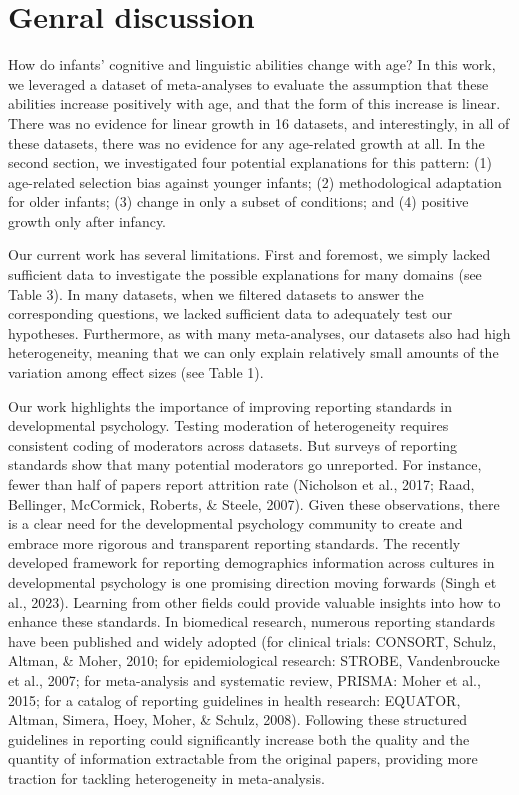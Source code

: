 \documentclass[
  man]{apa6}
\begin{document}
\hypertarget{genral-discussion}{%
\section{Genral discussion}\label{genral-discussion}}

How do infants' cognitive and linguistic abilities change with age? In this work, we leveraged a dataset of meta-analyses to evaluate the assumption that these abilities increase positively with age, and that the form of this increase is linear. There was no evidence for linear growth in 16 datasets, and interestingly, in all of these datasets, there was no evidence for any age-related growth at all. In the second section, we investigated four potential explanations for this pattern: (1) age-related selection bias against younger infants; (2) methodological adaptation for older infants; (3) change in only a subset of conditions; and (4) positive growth only after infancy.

Our current work has several limitations. First and foremost, we simply lacked sufficient data to investigate the possible explanations for many domains (see Table 3). In many datasets, when we filtered datasets to answer the corresponding questions, we lacked sufficient data to adequately test our hypotheses. Furthermore, as with many meta-analyses, our datasets also had high heterogeneity, meaning that we can only explain relatively small amounts of the variation among effect sizes (see Table 1).

Our work highlights the importance of improving reporting standards in developmental psychology. Testing moderation of heterogeneity requires consistent coding of moderators across datasets. But surveys of reporting standards show that many potential moderators go unreported. For instance, fewer than half of papers report attrition rate (Nicholson et al., 2017; Raad, Bellinger, McCormick, Roberts, \& Steele, 2007). Given these observations, there is a clear need for the developmental psychology community to create and embrace more rigorous and transparent reporting standards. The recently developed framework for reporting demographics information across cultures in developmental psychology is one promising direction moving forwards (Singh et al., 2023). Learning from other fields could provide valuable insights into how to enhance these standards. In biomedical research, numerous reporting standards have been published and widely adopted (for clinical trials: CONSORT, Schulz, Altman, \& Moher, 2010; for epidemiological research: STROBE, Vandenbroucke et al., 2007; for meta-analysis and systematic review, PRISMA: Moher et al., 2015; for a catalog of reporting guidelines in health research: EQUATOR, Altman, Simera, Hoey, Moher, \& Schulz, 2008). Following these structured guidelines in reporting could significantly increase both the quality and the quantity of information extractable from the original papers, providing more traction for tackling heterogeneity in meta-analysis.
\end{document}
